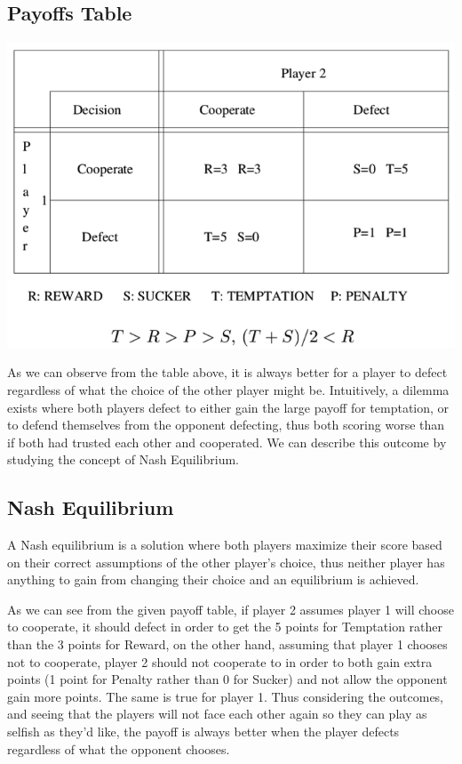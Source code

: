 \documentclass{icldt}
\numberwithin{equation}{section}       %
\begin{document}
\subsection{Payoffs Table}
\begin{center}
\includegraphics{payofftable.png}
\end{center}
As we can observe from the table above, it is always better for a player to defect regardless of what the choice of the other player might be. Intuitively, a dilemma exists where both players defect to either gain the large payoff for temptation, or to defend themselves from the opponent defecting, thus both scoring worse than if both had trusted each other and cooperated. We can describe this outcome by studying the concept of Nash Equilibrium.
\subsection{Nash Equilibrium}
A Nash equilibrium is a solution where both players maximize their score based on their correct assumptions of the other player's choice, thus neither player has anything to gain from changing their choice and an equilibrium is achieved. \cite{Osborne1994}

As we can see from the given payoff table, if player 2 assumes player 1 will choose to cooperate, it should defect in order to get the 5 points for Temptation rather than the 3 points for Reward, on the other hand, assuming that player 1 chooses not to cooperate, player 2 should not cooperate to in order to both gain extra points (1 point for Penalty rather than 0 for Sucker) and not allow the opponent gain more points. The same is true for player 1. Thus considering the outcomes, and seeing that the players will not face each other again so they can play as selfish as they'd like, the payoff is always better when the player defects regardless of what the opponent chooses. 
\end{document}
